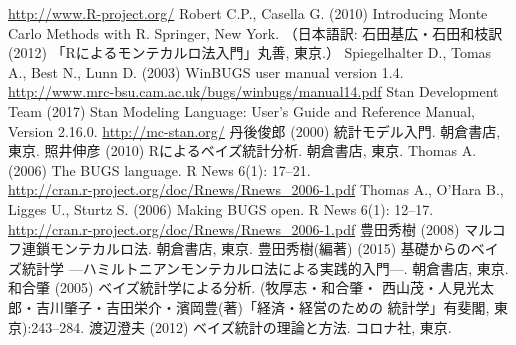 \documentclass[11pt,uplatex]{jsarticle}
\begin{document}
\begin{thebibliography}{99}
   \url{http://www.R-project.org/}
 Robert C.P., Casella G. (2010) Introducing Monte Carlo Methods with R.
  Springer, New York.
  （日本語訳: 石田基広・石田和枝訳 (2012) 「Rによるモンテカルロ法入門」丸善, 東京.）
 Spiegelhalter D., Tomas A., Best N., Lunn D. (2003)
  WinBUGS user manual version 1.4.\\
  \url{http://www.mrc-bsu.cam.ac.uk/bugs/winbugs/manual14.pdf}
 Stan Development Team (2017) Stan Modeling Language:
  User's Guide and Reference Manual, Version 2.16.0.
  \url{http://mc-stan.org/}
 丹後俊郎 (2000) 統計モデル入門. 朝倉書店, 東京.
 照井伸彦 (2010) Rによるベイズ統計分析. 朝倉書店, 東京.
 Thomas A. (2006) The BUGS language.
  R News 6(1): 17--21. \\
  \url{http://cran.r-project.org/doc/Rnews/Rnews_2006-1.pdf}
 Thomas A., O'Hara B., Ligges U., Sturtz S. (2006) Making BUGS open.
  R News 6(1): 12--17. \\
  \url{http://cran.r-project.org/doc/Rnews/Rnews_2006-1.pdf}
 豊田秀樹 (2008) マルコフ連鎖モンテカルロ法. 朝倉書店, 東京.
 豊田秀樹(編著) (2015) 基礎からのベイズ統計学
  ---ハミルトニアンモンテカルロ法による実践的入門---. 朝倉書店, 東京.
 和合肇 (2005) ベイズ統計学による分析. (牧厚志・和合肇・
  西山茂・人見光太郎・吉川肇子・吉田栄介・濱岡豊(著)「経済・経営のための
  統計学」有斐閣, 東京):243--284.
 渡辺澄夫 (2012) ベイズ統計の理論と方法. コロナ社, 東京.
\end{thebibliography}
\end{document}
